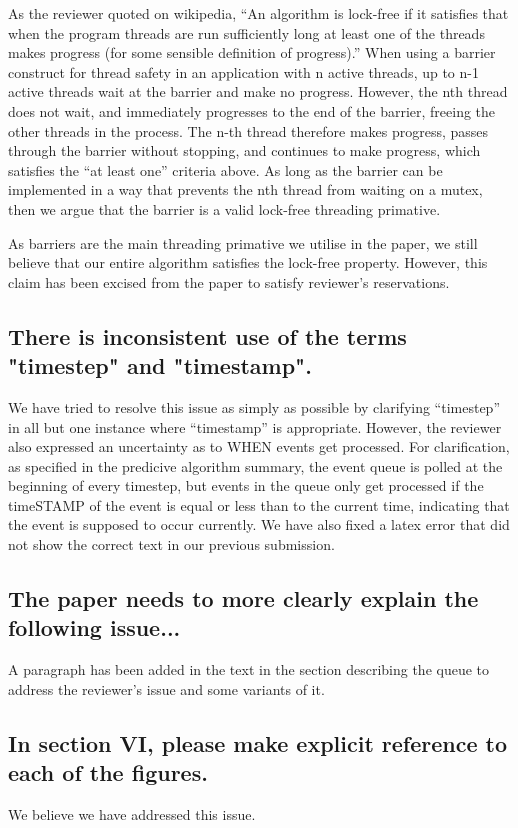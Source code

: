 \documentclass[letterpaper,10pt]{article}
\begin{document}
As the reviewer quoted on wikipedia, ``An algorithm is lock-free if it satisfies that when the program threads are run sufficiently long at least one of the threads makes progress (for some sensible definition of progress).''
When using a barrier construct for thread safety in an application with n active threads, up to n-1 active threads wait at the barrier and make no progress.  However, the nth thread
does not wait, and immediately progresses to the end of the barrier, freeing the other threads in the process.  The n-th thread therefore makes progress, passes through the barrier without stopping, and continues to make progress, which satisfies the ``at least one'' criteria above.
As long as the barrier can be implemented in a way that prevents the nth thread from waiting on a mutex, then we argue that the barrier is a valid lock-free threading primative.

As barriers are the main threading primative we utilise in the paper, we still believe that our entire algorithm satisfies the lock-free property.  However, this claim has been excised from the paper to satisfy reviewer's reservations.

\subsection{There is inconsistent use of the terms "timestep" and "timestamp". }
We have tried to resolve this issue as simply as possible by clarifying ``timestep'' in all but one instance where ``timestamp'' is appropriate.
However, the reviewer also expressed an uncertainty as to WHEN events get processed.  For clarification, as specified in the predicive algorithm summary, the event queue
is polled at the beginning of every timestep, but events in the queue only get processed if the timeSTAMP of the event is equal or less than to the current time, indicating that the event is supposed to occur currently.
We have also fixed a latex error that did not show the correct text in our previous submission.

\subsection{The paper needs to more clearly explain the following issue...}
A paragraph has been added in the text in the section describing the queue to address the reviewer's issue and some variants of it.

\subsection{In section VI, please make explicit reference to each of the figures.}
We believe we have addressed this issue.
\end{document}

